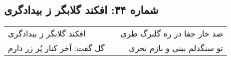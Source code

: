\begin{center}
\section*{شماره ۳۴: افکند گلابگر ز بیدادگری}
\label{sec:034}
\begin{longtable}{l p{0.5cm} r}
افکند گلابگر ز بیدادگری
&&
صد خار جفا در ره گلبرگ طری
\\
گل گفت: آخر کنار پُر زر دارم
&&
تو سنگدلم بینی و بازم نخری
\\
\end{longtable}
\end{center}
